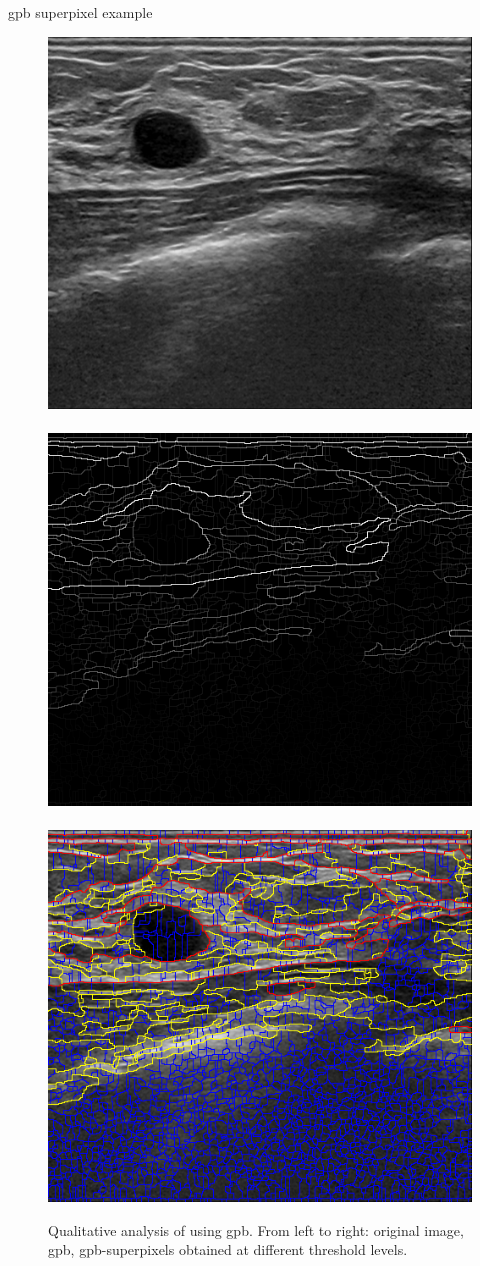 \begin{frame}{\acf{gpb} superpixel example}
\begin{figure}[Htbp]
\centering
\includegraphics[height=.28\textwidth]{gpb/000032.png}\,
\includegraphics[height=.28\textwidth]{gpb/000032_ucm.png}\,
\includegraphics[height=.28\textwidth]{gpb/14gpbTh.png}
\caption{Qualitative analysis of using \acs{gpb}. From left to right: original image, \acs{gpb}, \acs{gpb}-superpixels obtained at different threshold levels.}
\label{fig:gpbExample}
\end{figure}
\end{frame}

